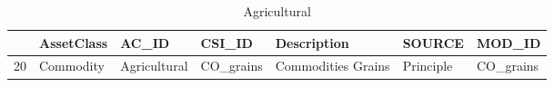 \begin{longtable}{rllllll}
\caption{Agricultural} \\ 
  \hline
 & AssetClass & AC\_ID & CSI\_ID & Description & SOURCE & MOD\_ID \\ 
  \hline
20 & Commodity & Agricultural & CO\_grains & Commodities Grains & Principle & CO\_grains \\ 
   \hline
\hline
\end{longtable}
